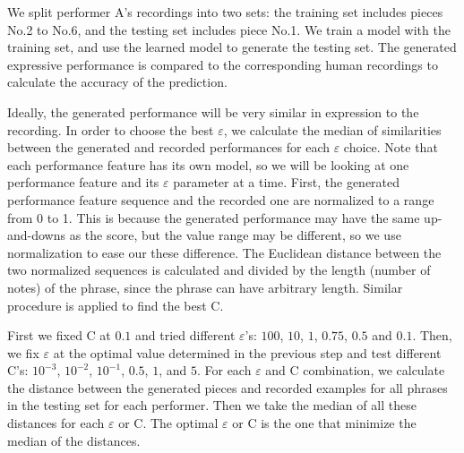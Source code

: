 We split performer A's recordings into two sets: the training set includes pieces No.2 to No.6, and the testing set includes piece No.1. We train a model with the training set, and use the learned model to generate the testing set. The generated expressive performance is compared to the corresponding human recordings to calculate the accuracy of the prediction.



Ideally, the generated performance will be very similar in expression to the recording. In order to choose the best $\varepsilon$, we calculate the median of similarities between the generated and recorded performances for each $\varepsilon$ choice. Note that each performance feature has its own model, so we will be looking at one performance feature and its $\varepsilon$  parameter at a time. 
First, the generated performance feature sequence and the recorded one are normalized to a range from 0 to 1. This is because the generated performance may have the same up-and-downs as the score, but the value range may be different, so we use normalization to ease our these difference. The Euclidean distance between the two normalized sequences is calculated and divided by the length (number of notes) of the phrase, since the phrase can have arbitrary length. Similar procedure is applied to find the best C.


First we fixed C at $0.1$ and tried different $\varepsilon$'s: $100$, $10$, $1$, $0.75$, $0.5$ and $0.1$. Then, we fix $\varepsilon$ at the optimal value determined in the previous step and test different C's: $10^{-3}$, $10^{-2}$, $10^{-1}$, $0.5$, $1$, and $5$. For each $\varepsilon$ and C combination, we calculate the distance between the generated pieces and recorded examples for all phrases in the testing set for each performer. Then we take the median of all these distances for each $\varepsilon$ or C. The optimal $\varepsilon$ or C is the one that minimize the median of the distances.


